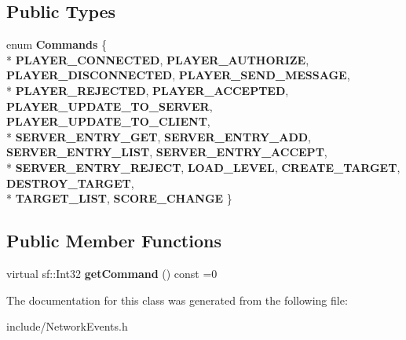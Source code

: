 \subsection*{Public Types}
\begin{DoxyCompactItemize}
\item 
enum {\bfseries Commands} \{ \\*
{\bfseries P\-L\-A\-Y\-E\-R\-\_\-\-C\-O\-N\-N\-E\-C\-T\-E\-D}, 
{\bfseries P\-L\-A\-Y\-E\-R\-\_\-\-A\-U\-T\-H\-O\-R\-I\-Z\-E}, 
{\bfseries P\-L\-A\-Y\-E\-R\-\_\-\-D\-I\-S\-C\-O\-N\-N\-E\-C\-T\-E\-D}, 
{\bfseries P\-L\-A\-Y\-E\-R\-\_\-\-S\-E\-N\-D\-\_\-\-M\-E\-S\-S\-A\-G\-E}, 
\\*
{\bfseries P\-L\-A\-Y\-E\-R\-\_\-\-R\-E\-J\-E\-C\-T\-E\-D}, 
{\bfseries P\-L\-A\-Y\-E\-R\-\_\-\-A\-C\-C\-E\-P\-T\-E\-D}, 
{\bfseries P\-L\-A\-Y\-E\-R\-\_\-\-U\-P\-D\-A\-T\-E\-\_\-\-T\-O\-\_\-\-S\-E\-R\-V\-E\-R}, 
{\bfseries P\-L\-A\-Y\-E\-R\-\_\-\-U\-P\-D\-A\-T\-E\-\_\-\-T\-O\-\_\-\-C\-L\-I\-E\-N\-T}, 
\\*
{\bfseries S\-E\-R\-V\-E\-R\-\_\-\-E\-N\-T\-R\-Y\-\_\-\-G\-E\-T}, 
{\bfseries S\-E\-R\-V\-E\-R\-\_\-\-E\-N\-T\-R\-Y\-\_\-\-A\-D\-D}, 
{\bfseries S\-E\-R\-V\-E\-R\-\_\-\-E\-N\-T\-R\-Y\-\_\-\-L\-I\-S\-T}, 
{\bfseries S\-E\-R\-V\-E\-R\-\_\-\-E\-N\-T\-R\-Y\-\_\-\-A\-C\-C\-E\-P\-T}, 
\\*
{\bfseries S\-E\-R\-V\-E\-R\-\_\-\-E\-N\-T\-R\-Y\-\_\-\-R\-E\-J\-E\-C\-T}, 
{\bfseries L\-O\-A\-D\-\_\-\-L\-E\-V\-E\-L}, 
{\bfseries C\-R\-E\-A\-T\-E\-\_\-\-T\-A\-R\-G\-E\-T}, 
{\bfseries D\-E\-S\-T\-R\-O\-Y\-\_\-\-T\-A\-R\-G\-E\-T}, 
\\*
{\bfseries T\-A\-R\-G\-E\-T\-\_\-\-L\-I\-S\-T}, 
{\bfseries S\-C\-O\-R\-E\-\_\-\-C\-H\-A\-N\-G\-E}
 \}
\end{DoxyCompactItemize}
\subsection*{Public Member Functions}
\begin{DoxyCompactItemize}
\item 
\hypertarget{class_network_event_a6148b15dfb7bc081628d2c0a73fd7751}{virtual sf\-::\-Int32 {\bfseries get\-Command} () const =0}\label{class_network_event_a6148b15dfb7bc081628d2c0a73fd7751}

\end{DoxyCompactItemize}


The documentation for this class was generated from the following file\-:\begin{DoxyCompactItemize}
\item 
include/Network\-Events.\-h\end{DoxyCompactItemize}
